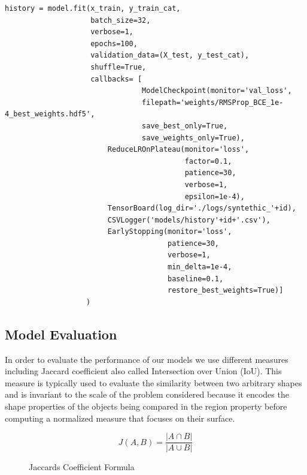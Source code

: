 \documentclass[12pt,a4paper]{scrartcl}
\begin{document}
\begin{lstlisting}[caption={Model B training parameters, this is a code snippet from the  \emph{train\_model\_B} method in \emph{train.py}},label={lst:fit-method-B}]
history = model.fit(x_train, y_train_cat,
                    batch_size=32,
                    verbose=1, 
                    epochs=100, 
                    validation_data=(X_test, y_test_cat), 
                    shuffle=True,
                    callbacks= [
                                ModelCheckpoint(monitor='val_loss',
                                filepath='weights/RMSProp_BCE_1e-4_best_weights.hdf5',
                                save_best_only=True,
                                save_weights_only=True),
                        ReduceLROnPlateau(monitor='loss',
                                          factor=0.1,
                                          patience=30,
                                          verbose=1,
                                          epsilon=1e-4),
                        TensorBoard(log_dir='./logs/syntethic_'+id),
                        CSVLogger('models/history'+id+'.csv'),
                        EarlyStopping(monitor='loss',
                                      patience=30,
                                      verbose=1,
                                      min_delta=1e-4,
                                      baseline=0.1,
                                      restore_best_weights=True)]
                   )

\end{lstlisting}

\subsection{Model Evaluation}
In order to evaluate the performance of our models we use different measures including Jaccard coefficient also called Intersection over Union (IoU). This measure is typically used to evaluate the similarity between two arbitrary shapes and is invariant to the scale of the problem considered because it encodes the shape properties of the objects being compared in the region property before computing a normalized measure that focuses on their surface\cite{IoU:2019}.

\begin{figure}[H]
   \[ J(A,B) = \frac{|A\cap B|}{|A\cup B|}\]
   \caption{Jaccards Coefficient Formula}
\end{figure}
\end{document}
